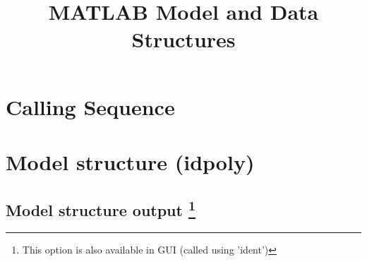 \documentclass[a4paper,12pt]{report}
\title{MATLAB Model and Data Structures}
\begin{document}
	

\maketitle
\tableofcontents


	
\chapter{Calling Sequence}	

		
	
	
\chapter{Model structure (idpoly)}
	
	
	\section{Model structure output \footnote{\label{dj}This option is also available in GUI (called using 'ident')}}
	
\end{document}
